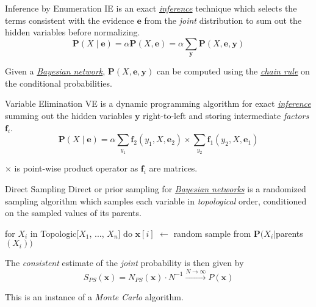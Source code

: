 \documentclass{cognito}
\begin{document}
\begin{note}{Inference by Enumeration}
	IE is an exact \hyperref[note:Probabilistic Inference]{\it inference} technique which
	selects the terms consistent with the evidence $\mathbf{e}$ from the \emph{joint} distribution to sum out the hidden variables before normalizing.
	$$
		\textstyle \mathbf{P}(X\mid \mathbf{e}) = \alpha \mathbf{P}(X, \mathbf{e}) = \alpha \sum_\mathbf{y} \mathbf{P}(X, \mathbf{e}, \mathbf{y}) 
	$$
	\begin{remark} Given a \hyperref[note:Bayesian Networks]{\emph{Bayesian network}}, $\mathbf{P}(X, \mathbf{e}, \mathbf{y})$
	can be computed using the \hyperref[note:Chain Rule]{\it chain rule} on the conditional probabilities.
	\end{remark}
	\vspace{-5pt}
\end{note}

\begin{note}{Variable Elimination}
	VE is a dynamic programming algorithm for exact \hyperref[note:Probabilistic Inference]{\it inference}
	summing out the hidden variables $\mathbf{y}$ right-to-left
	and storing intermediate \emph{factors} $\mathbf{f}_i$. 
	$$
	 \textstyle \mathbf{P}(X\mid \mathbf{e}) = \alpha \sum_{y_1} \mathbf{f}_2(y_1, X, \mathbf{e}_2) \times \sum_{y_2} \mathbf{f}_1(y_2, X, \mathbf{e}_1)
	$$
	\begin{remark} $\times$ is point-wise product operator as $\mathbf{f}_i$ are matrices.\end{remark}
	\vspace{-5pt}
\end{note}

\begin{note}{Direct Sampling}
	Direct or prior sampling for \hyperref[note:Bayesian Networks]{\it Bayesian networks} is a randomized sampling algorithm which samples
	each variable in \emph{topological} order, conditioned on the sampled values of its parents.
	\begin{code}
for $X_i$ in Topologic[$X_1$, ..., $X_n$] do
	$\mathbf{x}[i]$ $\leftarrow$ random sample from $\mathbf{P}(X_i | $parents$(X_i) )$
	\end{code}
	The \emph{consistent} estimate of the \emph{joint} probability is then given by
	$$
		\textstyle S_{PS}(\mathbf{x}) = N_{PS}(\mathbf{x}) \cdot N^{-1} \xrightarrow{N \to \infty } P(\mathbf{x})
	$$
	\begin{remark} This is an instance of a \emph{Monte Carlo} algorithm.\end{remark}
	\vspace{-5pt}
\end{note}
\end{document}
